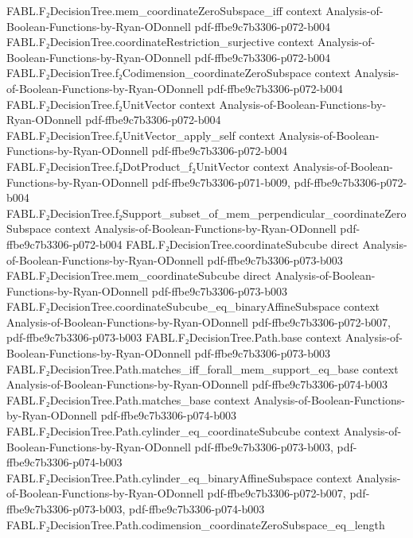 \begin{theorem}
  {FABL.F₂DecisionTree.mem_coordinateZeroSubspace_iff}
  {context}
  {Analysis-of-Boolean-Functions-by-Ryan-ODonnell}
  {pdf-ffbe9c7b3306-p072-b004}
\proofstep
  {FABL.F₂DecisionTree.coordinateRestriction_surjective}
  {context}
  {Analysis-of-Boolean-Functions-by-Ryan-ODonnell}
  {pdf-ffbe9c7b3306-p072-b004}
\proofstep
  {FABL.F₂DecisionTree.f₂Codimension_coordinateZeroSubspace}
  {context}
  {Analysis-of-Boolean-Functions-by-Ryan-ODonnell}
  {pdf-ffbe9c7b3306-p072-b004}
\proofstep
  {FABL.F₂DecisionTree.f₂UnitVector}
  {context}
  {Analysis-of-Boolean-Functions-by-Ryan-ODonnell}
  {pdf-ffbe9c7b3306-p072-b004}
\proofstep
  {FABL.F₂DecisionTree.f₂UnitVector_apply_self}
  {context}
  {Analysis-of-Boolean-Functions-by-Ryan-ODonnell}
  {pdf-ffbe9c7b3306-p072-b004}
\proofstep
  {FABL.F₂DecisionTree.f₂DotProduct_f₂UnitVector}
  {context}
  {Analysis-of-Boolean-Functions-by-Ryan-ODonnell}
  {pdf-ffbe9c7b3306-p071-b009,
    pdf-ffbe9c7b3306-p072-b004}
\proofstep
  {FABL.F₂DecisionTree.f₂Support_subset_of_mem_perpendicular_coordinateZeroSubspace}
  {context}
  {Analysis-of-Boolean-Functions-by-Ryan-ODonnell}
  {pdf-ffbe9c7b3306-p072-b004}
\proofstep
  {FABL.F₂DecisionTree.coordinateSubcube}
  {direct}
  {Analysis-of-Boolean-Functions-by-Ryan-ODonnell}
  {pdf-ffbe9c7b3306-p073-b003}
\proofstep
  {FABL.F₂DecisionTree.mem_coordinateSubcube}
  {direct}
  {Analysis-of-Boolean-Functions-by-Ryan-ODonnell}
  {pdf-ffbe9c7b3306-p073-b003}
\proofstep
  {FABL.F₂DecisionTree.coordinateSubcube_eq_binaryAffineSubspace}
  {context}
  {Analysis-of-Boolean-Functions-by-Ryan-ODonnell}
  {pdf-ffbe9c7b3306-p072-b007,
    pdf-ffbe9c7b3306-p073-b003}
\proofstep
  {FABL.F₂DecisionTree.Path.base}
  {context}
  {Analysis-of-Boolean-Functions-by-Ryan-ODonnell}
  {pdf-ffbe9c7b3306-p073-b003}
\proofstep
  {FABL.F₂DecisionTree.Path.matches_iff_forall_mem_support_eq_base}
  {context}
  {Analysis-of-Boolean-Functions-by-Ryan-ODonnell}
  {pdf-ffbe9c7b3306-p074-b003}
\proofstep
  {FABL.F₂DecisionTree.Path.matches_base}
  {context}
  {Analysis-of-Boolean-Functions-by-Ryan-ODonnell}
  {pdf-ffbe9c7b3306-p074-b003}
\proofstep
  {FABL.F₂DecisionTree.Path.cylinder_eq_coordinateSubcube}
  {context}
  {Analysis-of-Boolean-Functions-by-Ryan-ODonnell}
  {pdf-ffbe9c7b3306-p073-b003,
    pdf-ffbe9c7b3306-p074-b003}
\proofstep
  {FABL.F₂DecisionTree.Path.cylinder_eq_binaryAffineSubspace}
  {context}
  {Analysis-of-Boolean-Functions-by-Ryan-ODonnell}
  {pdf-ffbe9c7b3306-p072-b007,
    pdf-ffbe9c7b3306-p073-b003,
    pdf-ffbe9c7b3306-p074-b003}
\proofstep
  {FABL.F₂DecisionTree.Path.codimension_coordinateZeroSubspace_eq_length}

\end{theorem}
